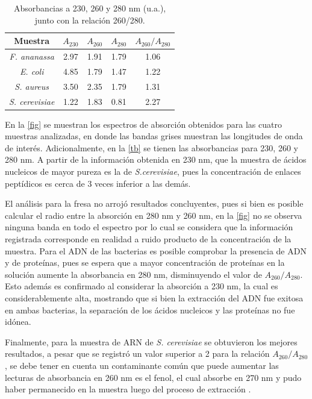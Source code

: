 \documentclass[fleqn,10pt]{SelfArx}
\begin{document}
	\begin{table}[h]
		\centering
		\caption{Absorbancias a 230, 260 y 280 nm (u.a.), junto con la relaci\'on 260/280.}
		\begin{tabular}{c|ccc|c}
			\hline
			\textbf{Muestra} & $A_{230}$ & $A_{260}$ & $A_{280}$ & $A_{260} / A_{280}$ \\
			\hline
			\textit{F. ananassa} & 2.97 & 1.91 & 1.79 & 1.06 \\
			\textit{E. coli} & 4.85 & 1.79 & 1.47 & 1.22 \\
			\textit{S. aureus} & 3.50 & 2.35 & 1.79 & 1.31 \\
			\textit{S. cerevisiae} & 1.22 & 1.83 & 0.81 & 2.27 \\
			\hline
		\end{tabular}
		\label{tb}
	\end{table}

	En la \autoref{fig} se muestran los espectros de absorción obtenidos para las cuatro muestras analizadas, en donde las bandas grises muestran las longitudes de onda de interés. Adicionalmente, en la \autoref{tb} se tienen las absorbancias para 230, 260 y 280 nm. A partir de la información obtenida en 230 nm, que la muestra de ácidos nucleicos de mayor pureza es la de \textit{S.cerevisiae}, pues la concentración de enlaces peptídicos es cerca de 3 veces inferior a las demás.

	El análisis para la fresa no arrojó resultados concluyentes, pues si bien es posible calcular el radio entre la absorción en 280 nm y 260 nm, en la \autoref{fig} no se observa ninguna banda en todo el espectro por lo cual se considera que la información registrada corresponde en realidad a ruido producto de la concentración de la muestra. Para el ADN de las bacterias es posible comprobar la presencia de ADN y de proteínas, pues se espera que a mayor concentración de proteínas en la solución aumente la absorbancia en 280 nm, disminuyendo el valor de $A_{260} / A_{280}$. Esto además es confirmado al considerar la absorción a 230 nm, la cual es considerablemente alta, mostrando que si bien la extracción del ADN fue exitosa en ambas bacterias, la separación de los ácidos nucleicos y las proteínas no fue idónea.
	
	Finalmente, para la muestra de ARN de \textit{S. cerevisiae} se obtuvieron los mejores resultados, a pesar que se registró un valor superior a 2 para la relación $A_{260} / A_{280}$, se debe tener en cuenta un contaminante com\'un que puede aumentar las lecturas de absorbancia en 260 nm es el fenol, el cual absorbe en 270 nm y pudo haber permanecido en la muestra luego del proceso de extracci\'on \cite{toni2018optimization}.
	
\end{document}
